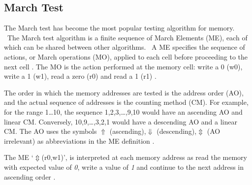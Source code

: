 \subsection{March Test}
The March test has become the most popular testing algorithm for memory.  The March test algorithm is a finite sequence of March Elements (ME), each of which can be shared between other algorithms.  A ME specifies the sequence of actions, or March operations (MO), applied to each cell before proceeding to the next cell \cite{199799}.  The MO is the action performed at the memory cell: write a 0 (w0), write a 1 (w1), read a zero (r0) and read a 1 (r1) \cite{199799}.

The order in which the memory addresses are tested is the address order (AO), and the actual sequence of addresses is the counting method (CM).  For example, for the range 1\ldots10, the sequence 1,2,3,\ldots,9,10 would have an ascending AO and linear CM.  Conversely, 10,9,\ldots,3,2,1 would have a descending AO and a linear CM. The AO uses the symbols $\Uparrow$ (ascending),$\Downarrow$ (descending),$\Updownarrow$ (AO irrelevant) as abbreviations in the ME definition \cite{199799}.

The ME ‘$\Updownarrow$(r0,w1)’, is interpreted at each memory address as read the memory with expected value of \textit{0}, write a value of \textit{1} and continue to the next address in ascending order \cite{5491773}.    



